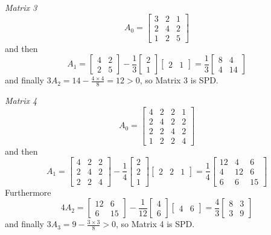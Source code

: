 \documentclass[12pt,a4paper]{article}
\begin{document}
\emph{Matrix 3}
\[
A_0=\begin{bmatrix}
3 & 2 & 1 \\
2 & 4 & 2 \\
1 & 2 & 5
\end{bmatrix}
\]
and then
\[
A_1=
\begin{bmatrix}
4&2\\
2&5
\end{bmatrix}-\frac{1}{3}\begin{bmatrix} 2 \\ 1 \end{bmatrix}\begin{bmatrix} 2 & 1 \end{bmatrix}=\frac{1}{3}
\begin{bmatrix}
8&4\\
4&14
\end{bmatrix}
\]
and finally $3A_2=14-\frac{4\ensuremath{\times} 4}{8} = 12 >0$, so Matrix 3 is SPD.

\emph{Matrix 4}
\[
A_0=\begin{bmatrix}
4 & 2 & 2 & 1 \\
2 & 4 & 2 & 2 \\
2 & 2 & 4 & 2 \\
1 & 2 & 2 & 4
\end{bmatrix}
\]
and then
\[
A_1=\begin{bmatrix}
4&2&2\\
2&4&2\\
2&2&4
\end{bmatrix}-\frac{1}{4}\begin{bmatrix} 2 \\ 2 \\ 1 \end{bmatrix}\begin{bmatrix} 2 & 2 & 1 \end{bmatrix}=\frac{1}{4}
\begin{bmatrix}
12&4&6\\
4&12&6\\
6&6&15
\end{bmatrix}
\]
Furthermore
\[
4A_2=\begin{bmatrix}
12&6\\
6&15
\end{bmatrix}-\frac{1}{12}\begin{bmatrix} 4 \\ 6 \end{bmatrix}\begin{bmatrix} 4 & 6 \end{bmatrix}=\frac{4}{3}
\begin{bmatrix}
8&3\\
3&9
\end{bmatrix}
\]
and finally $3A_3=9-\frac{3\ensuremath{\times} 3}{8}>0$, so Matrix 4 is SPD.
\end{document}
